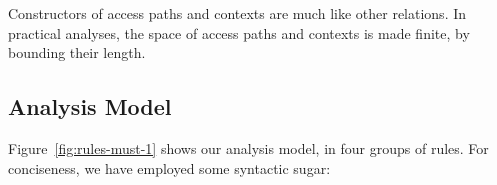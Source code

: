 Constructors of access paths and contexts are much like other relations. In
practical analyses, the space of access paths and contexts is made finite,
by bounding their length. %




\subsection{Analysis Model}

Figure~\ref{fig:rules-must-1} 
shows our analysis model, in four groups of rules. For conciseness, we have
employed some syntactic sugar:

